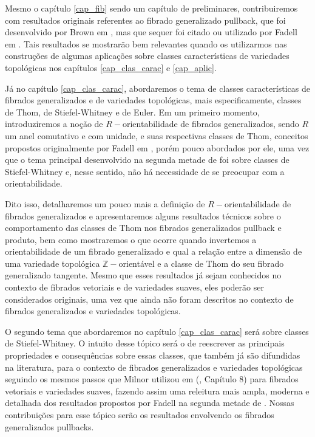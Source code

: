 \documentclass[12pt,oneside]{book} %
\newcommand{\Z}{\mathbb{Z}}
\begin{document}
\par Mesmo o capítulo \ref{cap_fib} sendo um capítulo de preliminares, contribuiremos com resultados originais referentes ao fibrado generalizado pullback, que foi desenvolvido por Brown em \cite{brown}, mas que sequer foi citado ou utilizado por Fadell em \cite{fadell_1}. Tais resultados se mostrarão bem relevantes quando os utilizarmos nas construções de algumas aplicações sobre classes características de variedades topológicas nos capítulos \ref{cap_clas_carac} e \ref{cap_aplic}.

\par Já no capítulo \ref{cap_clas_carac}, abordaremos o tema de classes características de fibrados generalizados e de variedades topológicas, mais especificamente, classes de Thom, de Stiefel-Whitney e de Euler. Em um primeiro momento, introduziremos a noção de $R-$orientabilidade de fibrados generalizados, sendo $R$ um anel comutativo e com unidade, e suas respectivas classes de Thom, conceitos propostos originalmente por Fadell em \cite{fadell_1}, porém pouco abordados por ele, uma vez que o tema principal desenvolvido na segunda metade de \cite{fadell_1} foi sobre classes de Stiefel-Whitney e, nesse sentido, não há necessidade de se preocupar com a orientabilidade.

\par Dito isso, detalharemos um pouco mais a definição de $R-$orientabilidade de fibrados generalizados e apresentaremos alguns resultados técnicos sobre o comportamento das classes de Thom nos fibrados generalizados pullback e produto, bem como mostraremos o que ocorre quando invertemos a orientabilidade de um fibrado generalizado e qual a relação entre a dimensão de uma variedade topológica $\Z-$orientável e a classe de Thom do seu fibrado generalizado tangente. Mesmo que esses resultados já sejam conhecidos no contexto de fibrados vetoriais e de variedades suaves, eles poderão ser considerados originais, uma vez que ainda não foram descritos no contexto de fibrados generalizados e variedades topológicas.

\par O segundo tema que abordaremos no capítulo \ref{cap_clas_carac} será sobre classes de Stiefel-Whitney. O intuito desse tópico será o de reescrever as principais propriedades e consequências sobre essas classes, que também já são difundidas na literatura, para o contexto de fibrados generalizados e variedades topológicas seguindo os mesmos passos que Milnor utilizou em (\cite{milnor_1}, Capítulo 8) para fibrados vetoriais e variedades suaves, fazendo assim uma releitura mais ampla, moderna e detalhada dos resultados propostos por Fadell na segunda metade de \cite{fadell_1}. Nossas contribuições para esse tópico serão os resultados envolvendo os fibrados generalizados pullbacks.
\end{document}

